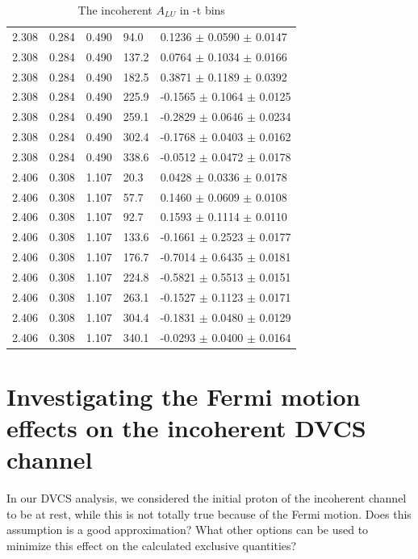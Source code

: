 \begin{table}[!h]
\begin{center}
\begin{tabular}{||l|l|l|l|l||}
  2.308 & 0.284 & 0.490  & 94.0  &  0.1236 $\pm$ 0.0590 $\pm$ 0.0147 \\
  2.308 & 0.284 & 0.490  & 137.2 &  0.0764 $\pm$ 0.1034 $\pm$ 0.0166 \\
  2.308 & 0.284 & 0.490  & 182.5 &  0.3871 $\pm$ 0.1189 $\pm$ 0.0392 \\
  2.308 & 0.284 & 0.490  & 225.9 & -0.1565 $\pm$ 0.1064 $\pm$ 0.0125 \\
  2.308 & 0.284 & 0.490  & 259.1 & -0.2829 $\pm$ 0.0646 $\pm$ 0.0234 \\
  2.308 & 0.284 & 0.490  & 302.4 & -0.1768 $\pm$ 0.0403 $\pm$ 0.0162 \\
  2.308 & 0.284 & 0.490  & 338.6 & -0.0512 $\pm$ 0.0472 $\pm$ 0.0178 \\
 \hline                                    
   2.406 & 0.308 & 1.107 & 20.3  &  0.0428 $\pm$ 0.0336 $\pm$ 0.0178 \\
   2.406 & 0.308 & 1.107 & 57.7  &  0.1460 $\pm$ 0.0609 $\pm$ 0.0108 \\
   2.406 & 0.308 & 1.107 & 92.7  &  0.1593 $\pm$ 0.1114 $\pm$ 0.0110 \\
   2.406 & 0.308 & 1.107 & 133.6 & -0.1661 $\pm$ 0.2523 $\pm$ 0.0177 \\
   2.406 & 0.308 & 1.107 & 176.7 & -0.7014 $\pm$ 0.6435 $\pm$ 0.0181 \\
   2.406 & 0.308 & 1.107 & 224.8 & -0.5821 $\pm$ 0.5513 $\pm$ 0.0151 \\
   2.406 & 0.308 & 1.107 & 263.1 & -0.1527 $\pm$ 0.1123 $\pm$ 0.0171 \\
   2.406 & 0.308 & 1.107 & 304.4 & -0.1831 $\pm$ 0.0480 $\pm$ 0.0129 \\
   2.406 & 0.308 & 1.107 & 340.1 & -0.0293 $\pm$ 0.0400 $\pm$ 0.0164 \\

 \hline
 \hline
 \end{tabular}
 \caption{The incoherent $A_{LU}$ in -t bins}
 \label{table:InCoh_t_BSA}
 \end{center}
\end{table}

\chapter{Investigating the Fermi motion effects on the incoherent DVCS channel}

In our DVCS analysis, we considered the initial proton of the incoherent 
channel to be at rest, while this is not totally true because of the Fermi 
motion. Does this assumption is a good approximation? What other options can be 
used to minimize this effect on the calculated exclusive quantities?\\

